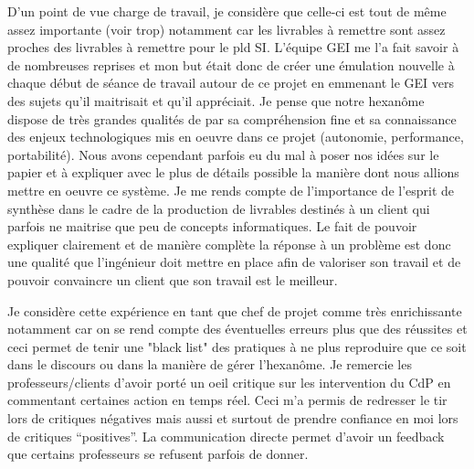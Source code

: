 D'un point de vue charge de travail, je considère que celle-ci est tout de même assez importante (voir trop) notamment car les livrables à remettre sont assez proches des livrables à remettre pour le pld SI. L'équipe GEI me l'a fait savoir à de nombreuses reprises et mon but était donc de créer une émulation nouvelle à chaque début de séance de travail autour de ce projet en emmenant le GEI vers des sujets qu'il maitrisait et qu'il appréciait. Je pense que notre hexanôme dispose de très grandes qualités de par sa compréhension fine et sa connaissance des enjeux technologiques mis en oeuvre dans ce projet (autonomie, performance, portabilité). Nous avons cependant parfois eu du mal à poser nos idées sur le papier et à expliquer avec le plus de détails possible la manière dont nous allions mettre en oeuvre ce système. Je me rends compte de l'importance de l'esprit de synthèse dans le cadre de la production de livrables destinés à un client qui parfois ne maitrise que peu de concepts informatiques. Le fait de pouvoir expliquer clairement et de manière complète la réponse à un problème est donc une qualité que l'ingénieur doit mettre en place afin de valoriser son travail et de pouvoir convaincre un client que son travail est le meilleur.

Je considère cette expérience en tant que chef de projet comme très enrichissante notamment car on se rend compte des éventuelles erreurs plus que des réussites et ceci permet de tenir une "black list" des pratiques à ne plus reproduire que ce soit dans le discours ou dans la manière de gérer l'hexanôme.
Je remercie les professeurs/clients d'avoir porté un oeil critique sur les intervention du CdP en commentant certaines action en temps réel. Ceci m'a permis de redresser le tir lors de critiques \og négatives \fg mais aussi et surtout de prendre confiance en moi lors de critiques ``positives''. La communication directe permet d'avoir un feedback que certains professeurs se refusent parfois de donner.